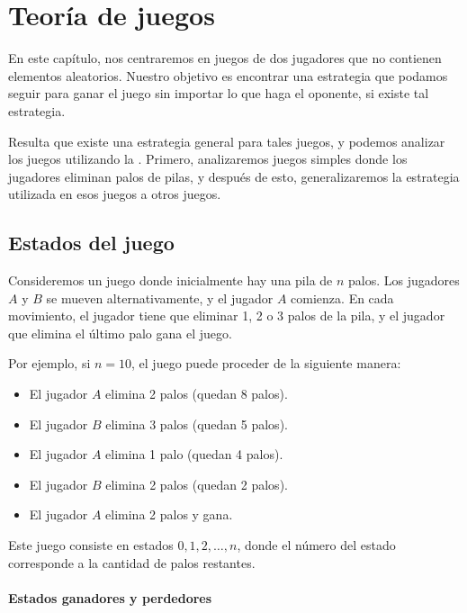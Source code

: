 \chapter{Teoría de juegos}

En este capítulo, nos centraremos en juegos de dos jugadores
que no contienen elementos aleatorios.
Nuestro objetivo es encontrar una estrategia que podamos
seguir para ganar el juego
sin importar lo que haga el oponente,
si existe tal estrategia.

Resulta que existe una estrategia general
para tales juegos,
y podemos analizar los juegos utilizando la .
Primero, analizaremos juegos simples donde
los jugadores eliminan palos de pilas,
y después de esto, generalizaremos la estrategia
utilizada en esos juegos a otros juegos.

\section{Estados del juego}

Consideremos un juego donde inicialmente hay
una pila de $n$ palos.
Los jugadores $A$ y $B$ se mueven alternativamente,
y el jugador $A$ comienza.
En cada movimiento, el jugador tiene que eliminar
1, 2 o 3 palos de la pila,
y el jugador que elimina el último palo gana el juego.

Por ejemplo, si $n=10$, el juego puede proceder de la siguiente manera:
\begin{itemize}[noitemsep]
\item El jugador $A$ elimina 2 palos (quedan 8 palos).
\item El jugador $B$ elimina 3 palos (quedan 5 palos).
\item El jugador $A$ elimina 1 palo (quedan 4 palos).
\item El jugador $B$ elimina 2 palos (quedan 2 palos).
\item El jugador $A$ elimina 2 palos y gana.
\end{itemize}

Este juego consiste en estados $0,1,2,\ldots,n$,
donde el número del estado corresponde a
la cantidad de palos restantes.

\subsubsection{Estados ganadores y perdedores}


